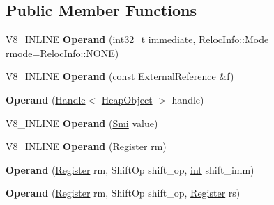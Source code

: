 \subsection*{Public Member Functions}
\begin{DoxyCompactItemize}
\item 
\mbox{\label{classv8_1_1internal_1_1Operand_ad16a1a70a71a30a8a05f19afa9fed976}} 
V8\+\_\+\+I\+N\+L\+I\+NE {\bfseries Operand} (int32\+\_\+t immediate, Reloc\+Info\+::\+Mode rmode=Reloc\+Info\+::\+N\+O\+NE)
\item 
\mbox{\label{classv8_1_1internal_1_1Operand_a8ff01211ace7b032a0ff733298fa3bde}} 
V8\+\_\+\+I\+N\+L\+I\+NE {\bfseries Operand} (const \mbox{\hyperlink{classv8_1_1internal_1_1ExternalReference}{External\+Reference}} \&f)
\item 
\mbox{\label{classv8_1_1internal_1_1Operand_a89275469683feb79dbec2790f984cf2d}} 
{\bfseries Operand} (\mbox{\hyperlink{classv8_1_1internal_1_1Handle}{Handle}}$<$ \mbox{\hyperlink{classv8_1_1internal_1_1HeapObject}{Heap\+Object}} $>$ handle)
\item 
\mbox{\label{classv8_1_1internal_1_1Operand_a249305d66784e81ae4159b33c061e7f2}} 
V8\+\_\+\+I\+N\+L\+I\+NE {\bfseries Operand} (\mbox{\hyperlink{classv8_1_1internal_1_1Smi}{Smi}} value)
\item 
\mbox{\label{classv8_1_1internal_1_1Operand_af4145d243c4a3b8f27e497f8a15f2d87}} 
V8\+\_\+\+I\+N\+L\+I\+NE {\bfseries Operand} (\mbox{\hyperlink{classv8_1_1internal_1_1Register}{Register}} rm)
\item 
\mbox{\label{classv8_1_1internal_1_1Operand_a1f0c9654c35e3d227088257c9a93c172}} 
{\bfseries Operand} (\mbox{\hyperlink{classv8_1_1internal_1_1Register}{Register}} rm, Shift\+Op shift\+\_\+op, \mbox{\hyperlink{classint}{int}} shift\+\_\+imm)
\item 
\mbox{\label{classv8_1_1internal_1_1Operand_a79e4fffed4127de2bf5f0674856a41e5}} 
{\bfseries Operand} (\mbox{\hyperlink{classv8_1_1internal_1_1Register}{Register}} rm, Shift\+Op shift\+\_\+op, \mbox{\hyperlink{classv8_1_1internal_1_1Register}{Register}} rs)

\end{DoxyCompactItemize}
